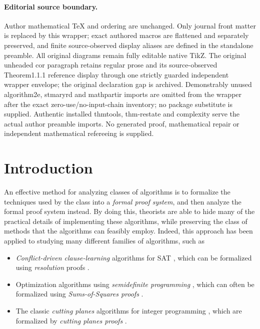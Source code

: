 \documentclass[11pt]{article}
\numberwithin{equation}{section}
\theoremstyle{definition}
\theoremstyle{plain}
\newcounter{cor}\renewcommand{\thecor}{1.1.\arabic{cor}}\newenvironment{cor}{\ifnum\value{cor}=0\refstepcounter{cor}\else\PackageError{toc-native-compat}{Unsupported additional cor envelope}{Only the one exact source-observed cor paragraph is allowed.}\fi}{}\providecommand{\corautorefname}{Theorem}
\begin{document}
\paragraph{Editorial source boundary.}
Author mathematical TeX and ordering are unchanged. Only journal front matter is replaced by this wrapper; exact authored macros are flattened and separately preserved, and finite source-observed display aliases are defined in the standalone preamble. All original diagrams remain fully editable native TikZ. The original unheaded cor paragraph retains regular prose and its source-observed Theorem1.1.1 reference display through one strictly guarded independent wrapper envelope; the original declaration gap is archived. Demonstrably unused algorithm2e, stmaryrd and mathpartir imports are omitted from the wrapper after the exact zero-use/no-input-chain inventory; no package substitute is supplied. Authentic installed thmtools, thm-restate and complexity serve the actual author preamble imports. No generated proof, mathematical repair or independent mathematical refereeing is supplied. 
\clearpage

%
%
%

\section{Introduction}
\label{sec:intro}
%

An effective method for analyzing classes of algorithms is to formalize the techniques used by the class into a \emph{formal proof system}, and then analyze the formal proof system instead. 
By doing this, theorists are able to hide many of the practical details of implementing these algorithms, while preserving the class of methods that the algorithms can feasibly employ.
Indeed, this approach has been applied to %
studying  %
many different families of algorithms, such as 
\begin{itemize}
\item \emph{Conflict-driven clause-learning} algorithms for SAT
\cite{BayardoS97,MarquesS99,MoskewiczMZZM01}, 
which can be formalized using \emph{resolution} proofs \cite{DavisP60}.
	\item Optimization algorithms using \emph{semidefinite programming} \cite{Goemans1994,parrilo2000}, which can often be formalized using \emph{Sums-of-Squares proofs} \cite{dima-sos,BarakBHKSZ12}.
	\item The classic \emph{cutting planes} algorithms for integer programming \cite{gomory1963algorithm,Chvatal73a}, which are formalized by \emph{cutting planes proofs} \cite{Chvatal73a, Chvatal84, CookCT87}.
\end{itemize}
\end{document}
